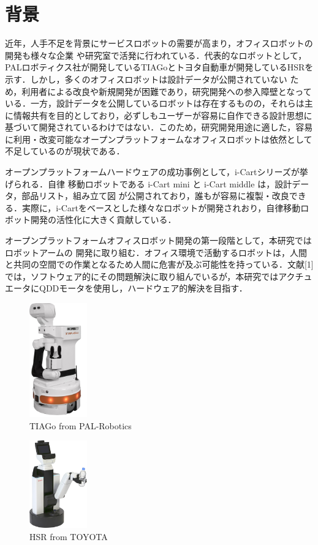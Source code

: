 
\section{背景}
近年，人手不足を背景にサービスロボットの需要が高まり，オフィスロボットの開発も様々な企業
や研究室で活発に行われている．代表的なロボットとして，PALロボティクス社が開発しているTIAGoとトヨタ自動車が開発しているHSRを示す．しかし，多くのオフィスロボットは設計データが公開されていない
ため，利用者による改良や新規開発が困難であり，研究開発への参入障壁となっている．一方，設計データを公開しているロボットは存在するものの，それらは主に情報共有を目的としており，必ずしもユーザーが容易に自作できる設計思想に基づいて開発されているわけではない．このため，研究開発用途に適した，容易に利用・改変可能なオープンプラットフォームなオフィスロボットは依然として不足しているのが現状である．

オープンプラットフォームハードウェアの成功事例として，i-Cartシリーズが挙げられる．自律
移動ロボットである i-Cart mini と i-Cart middle は，設計データ，部品リスト，組み立て図
が公開されており，誰もが容易に複製・改良できる．実際に，i-Cartをベースとした様々なロボットが開発されおり，自律移動ロボット開発の活性化に大きく貢献している．

オープンプラットフォームオフィスロボット開発の第一段階として，本研究ではロボットアームの
開発に取り組む．オフィス環境で活動するロボットは，人間と共同の空間での作業となるため人間に危害が及ぶ可能性を持っている．文献[1]では，ソフトウェア的にその問題解決に取り組んでいるが，本研究ではアクチュエータにQDDモータを使用し，ハードウェア的解決を目指す．
\begin{figure}[h]
  \centering
  \includegraphics[width=25mm]{images/png/TIAGo.png}
  \caption{TIAGo from PAL-Robotics}
  \label{fig_TIAGo}
\end{figure}
\begin{figure}[h]
  \centering
  \includegraphics[width=25mm]{images/png/HSR.png}
  \caption{HSR from TOYOTA}
  \label{fig_HSR}
\end{figure}


